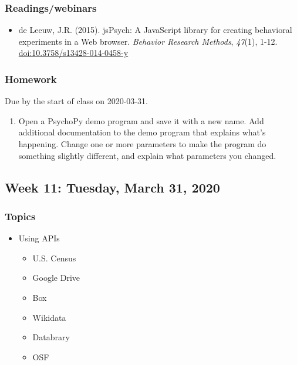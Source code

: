 \documentclass[
]{article}
\providecommand{\tightlist}{%
  \setlength{\itemsep}{0pt}\setlength{\parskip}{0pt}}
\begin{document}
\hypertarget{readingswebinars-7}{%
\subsubsection{Readings/webinars}\label{readingswebinars-7}}

\begin{itemize}
\tightlist
\item
  de Leeuw, J.R. (2015). jsPsych: A JavaScript library for creating
  behavioral experiments in a Web browser. \emph{Behavior Research
  Methods}, \emph{47}(1), 1-12. \url{doi:10.3758/s13428-014-0458-y}
\end{itemize}

\hypertarget{homework-9}{%
\subsubsection{Homework}\label{homework-9}}

Due by the start of class on 2020-03-31.

\begin{enumerate}
\def\labelenumi{\arabic{enumi}.}
\tightlist
\item
  Open a PsychoPy demo program and save it with a new name. Add
  additional documentation to the demo program that explains what's
  happening. Change one or more parameters to make the program do
  something slightly different, and explain what parameters you changed.
\end{enumerate}

\hypertarget{week-11-tuesday-march-31-2020}{%
\subsection{Week 11: Tuesday, March 31,
2020}\label{week-11-tuesday-march-31-2020}}

\hypertarget{topics-10}{%
\subsubsection{Topics}\label{topics-10}}

\begin{itemize}
\tightlist
\item
  Using APIs

  \begin{itemize}
  \tightlist
  \item
    U.S. Census
  \item
    Google Drive
  \item
    Box
  \item
    Wikidata
  \item
    Databrary
  \item
    OSF
  \end{itemize}
\end{itemize}
\end{document}
